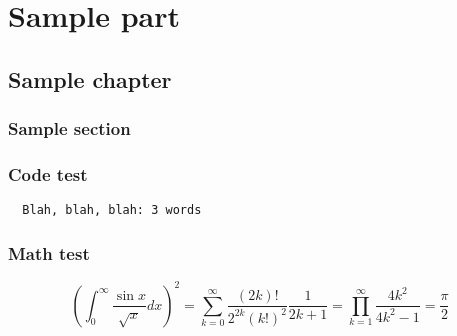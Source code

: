 \documentclass{book}
\begin{document}
\part{Sample part}
\chapter{Sample chapter}
\section{Sample section}
\lipsum[1-3]
\section{Code test}
\begin{verbatim}
  Blah, blah, blah: 3 words
\end{verbatim}
\section{Math test}
\begin{equation}
\left( \int _0 ^\infty \frac{\sin x}{\sqrt{x}} dx \right) ^2
= \sum _{k=0} ^\infty \frac{(2k)!}{2^{2k} (k!)^2} \frac{1}{2k+1}
= \prod _{k=1} ^\infty \frac{4 k^2}{4 k^2 - 1}
= \frac{\pi}{2}
\end{equation}
\end{document}
